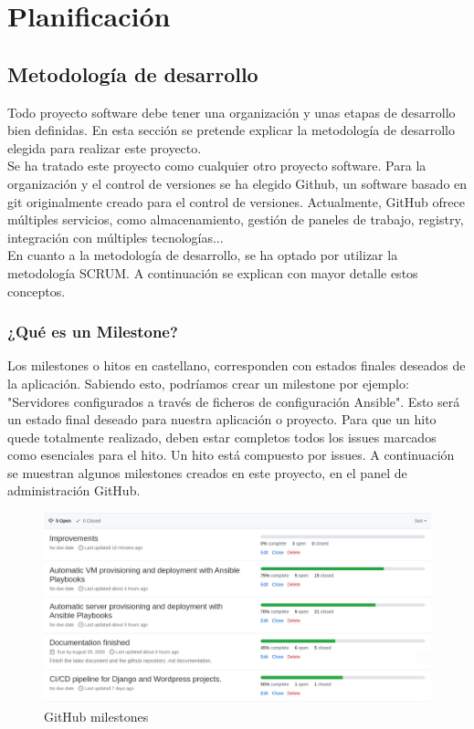 \chapter {Planificación}

\section{Metodología de desarrollo}
\begin{text}
	Todo proyecto software debe tener una organización y unas etapas de desarrollo bien definidas. En esta sección se pretende explicar la metodología de desarrollo elegida para realizar este proyecto. \\
	Se ha tratado este proyecto como cualquier otro proyecto software. Para la organización y el control de versiones se ha elegido Github, un software basado en git originalmente creado para el control de versiones. Actualmente, GitHub ofrece múltiples servicios, como almacenamiento, gestión de paneles de trabajo, registry, integración con múltiples tecnologías... \\
	En cuanto a la metodología de desarrollo, se ha optado por utilizar la metodología SCRUM. A continuación se explican con mayor detalle estos conceptos.
\end{text}

\subsection{¿Qué es un Milestone?}
\label{milestones}
\begin{text}
	Los milestones o hitos en castellano, corresponden con estados finales deseados de la aplicación. Sabiendo esto, podríamos crear un milestone por ejemplo: "Servidores configurados a través de ficheros de configuración Ansible". Esto será un estado final deseado para nuestra aplicación o proyecto. Para que un hito quede totalmente realizado, deben estar completos todos los issues marcados como esenciales para el hito. Un hito está compuesto por issues. A continuación se muestran algunos milestones creados en este proyecto, en el panel de administración GitHub.
	
	\begin{figure}[!hbt]
		\centering
		\includegraphics[scale=0.37]{imagenes/Analisis/milestones.png}
		\caption[GitHub milestones]{GitHub milestones \cite{github-issue}}
		\label{github_milestones}
	\end{figure}
\end{text}

